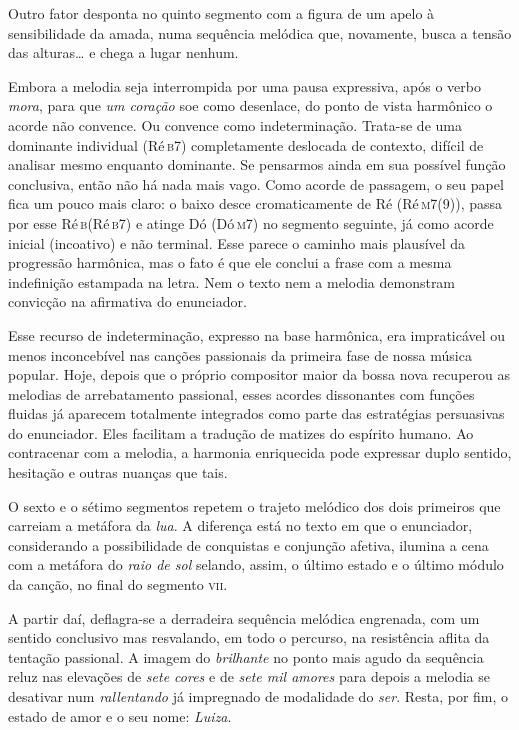 
Outro fator desponta no quinto segmento com a figura de um apelo à
sensibilidade da amada, numa sequência melódica que, novamente, busca a
tensão das alturas\ldots{} e chega a lugar nenhum.


Embora a melodia seja interrompida por uma pausa expressiva, após o
verbo \textit{mora}, para que \textit{um coração} soe como desenlace, do ponto de
vista harmônico o acorde não convence. Ou convence como indeterminação.
Trata-se de uma dominante individual (Ré\,\textsc{b7}) completamente deslocada de
contexto, difícil de analisar mesmo enquanto dominante. Se pensarmos
ainda em sua possível função conclusiva, então não há nada mais vago.
Como acorde de passagem, o seu papel fica um pouco mais claro: o baixo
desce cromaticamente de Ré (Ré\,\textsc{m7(9)}), passa por esse Ré\,\textsc{b}(Ré\,\textsc{b7}) e atinge
Dó (Dó\,\textsc{m7}) no segmento seguinte, já como acorde inicial (incoativo) e não
terminal. Esse parece o caminho mais plausível da progressão harmônica,
mas o fato é que ele conclui a frase com a mesma indefinição estampada
na letra. Nem o texto nem a melodia demonstram convicção na afirmativa
do enunciador.

Esse recurso de indeterminação, expresso na base harmônica, era
impraticável ou menos inconcebível nas canções passionais da primeira
fase de nossa música popular. Hoje, depois que o próprio compositor
maior da bossa nova recuperou as melodias de arrebatamento passional,
esses acordes dissonantes com funções fluidas já aparecem totalmente
integrados como parte das estratégias persuasivas do enunciador. Eles
facilitam a tradução de matizes do espírito humano. Ao contracenar com a
melodia, a harmonia enriquecida pode expressar duplo sentido, hesitação
e outras nuanças que tais.

O sexto e o sétimo segmentos repetem o trajeto melódico dos dois
primeiros que carreiam a metáfora da \textit{lua}. A diferença está no texto
em que o enunciador, considerando a possibilidade de conquistas e
conjunção afetiva, ilumina a cena com a metáfora do \textit{raio de sol}
selando, assim, o último estado e o último módulo da canção, no final do
segmento \textsc{vii}.


A partir daí, deflagra-se a derradeira sequência melódica engrenada, com
um sentido conclusivo mas resvalando, em todo o percurso, na resistência
aflita da tentação passional. A imagem do \textit{brilhante} no ponto mais
agudo da sequência reluz nas elevações de \textit{sete cores} e de \textit{sete mil
amores} para depois a melodia se desativar num \textit{rallentando} já
impregnado de modalidade do \textit{ser}. Resta, por fim, o estado de amor e o
seu nome: \textit{Luiza}.

